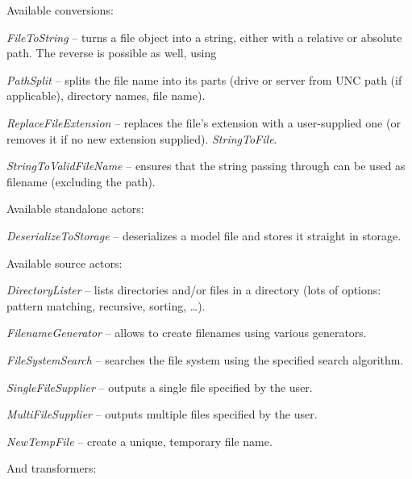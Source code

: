 Available conversions:
\begin{tight_itemize}
	\item \textit{FileToString} -- turns a file object into a string, either with a 
	relative or absolute path. The reverse is possible as well, using
	\item \textit{PathSplit} -- splits the file name into its parts (drive or
	server from UNC path (if applicable), directory names, file name).
	\item \textit{ReplaceFileExtension} -- replaces the file's extension with
	a user-supplied one (or removes it if no new extension supplied).
	\textit{StringToFile}.
	\item \textit{StringToValidFileName} -- ensures that the string passing through can 
	be used as filename (excluding the path).
\end{tight_itemize}
Available standalone actors:
\begin{tight_itemize}
	\item \textit{DeserializeToStorage} -- deserializes a model file and
	stores it straight in storage.
\end{tight_itemize}
Available source actors:
\begin{tight_itemize}
	\item \textit{DirectoryLister} -- lists directories and/or files in a
	directory (lots of options: pattern matching, recursive, sorting, \ldots).
	\item \textit{FilenameGenerator} -- allows to create filenames using various
	generators.
	\item \textit{FileSystemSearch} -- searches the file system using the
	specified search algorithm.
	\item \textit{SingleFileSupplier} -- outputs a single file specified by the
	user.
	\item \textit{MultiFileSupplier} -- outputs multiple files specified by the
	user.
	\item \textit{NewTempFile} -- create a unique, temporary file name.
\end{tight_itemize}
And transformers:
